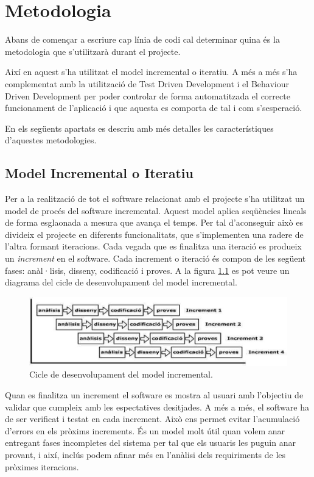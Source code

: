 \chapter{Metodologia}
\label{chap:metodologia}

Abans de començar a escriure cap línia de codi cal determinar quina és la metodologia que s'utilitzarà durant el projecte. 

Així en aquest s'ha utilitzat el model incremental o iteratiu. A més a més s'ha complementat amb la utilització de Test Driven Development i el Behaviour Driven Development per poder controlar de forma automatitzada el correcte funcionament de l'aplicació i que aquesta es comporta de tal i com s'sesperació.

En els següents apartats es descriu amb més detalles les característiques d'aquestes metodologies.  

\section{Model Incremental o Iteratiu}

Per a la realització de tot el software relacionat amb el projecte s’ha utilitzat un model de procés del software incremental. Aquest model aplica seqüències lineals de forma esglaonada a mesura que avança el temps. Per tal d'aconseguir això es divideix el projecte en diferents funcionalitats, que s'implementen una radere de l'altra formant iteracions. Cada vegada que es finalitza una iteració es produeix un \emph{increment} en el software. Cada increment o iteració és compon de les següent fases: anàl·lisis, disseny, codificació i proves. A la figura \ref{fig:mii} es pot veure un diagrama del cicle de desenvolupament del model incremental.

\begin{figure}[htbp]
\centering\includegraphics[width=12cm]{img/model-incremental.png}
\caption{Cicle de desenvolupament del model incremental.}
\label{fig:mii}
\end{figure} 

Quan es finalitza un increment el software es mostra al usuari amb l'objectiu de validar que cumpleix amb les espectatives desitjades. A més a més, el software ha de ser verificat i testat en cada increment. Això ens permet evitar l'acumulació d'errors en els pròxims increments. És un model molt útil quan volem anar entregant fases incompletes del sistema per tal que els usuaris les puguin anar provant, i així, inclús podem afinar més en l’anàlisi dels requiriments de les pròximes iteracions.

